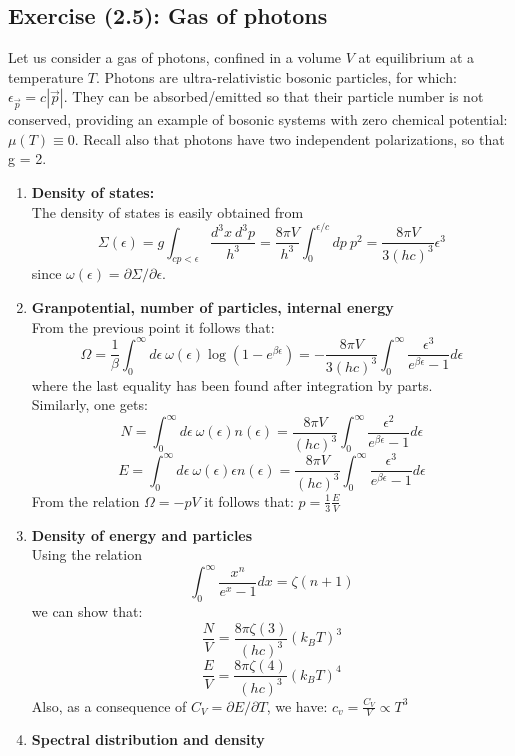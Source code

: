 \subsection{Exercise (2.5): Gas of photons}
Let us consider a gas of photons, confined in a volume $V$ at equilibrium at a temperature $T$.
Photons are ultra-relativistic bosonic particles, for which: $\epsilon_{\vec p} = c|\vec p|$. They can be absorbed/emitted so that their particle number is not conserved, providing an example of bosonic systems with zero chemical potential: $\mu(T) \equiv 0$. Recall also that photons have two independent polarizations, so that g = 2.
\begin{enumerate}
    \item \textbf{Density of states:}\\
    The density of states is easily obtained from $$\Sigma(\epsilon) = g\int_{cp < \epsilon} \frac{d^3 x\ d^3p}{h^3} = \frac{8\pi V}{h^3} \int_0^{\epsilon/c} dp \ p^2 = \frac{8\pi V}{3(hc)^3}\epsilon^3$$
    since $\omega (\epsilon) = \partial\Sigma / \partial \epsilon$.
    \item \textbf{Granpotential, number of particles, internal energy}\\
    From the previous point it follows that:
    $$\Omega = \frac 1\beta \int_0^\infty d\epsilon \ \omega(\epsilon) \log(1-e^{\beta \epsilon}) = -\frac{8\pi V}{3(hc)^3} \int_0^\infty \frac{\epsilon^3}{e^{\beta \epsilon} - 1} d\epsilon$$
    where the last equality has been found after integration by parts.\\Similarly, one gets:
    $$ N = \int_0^\infty d\epsilon \ \omega(\epsilon) n(\epsilon) = \frac{8\pi V}{(hc)^3} \int_0^\infty \frac{\epsilon^2}{e^{\beta \epsilon}-1} d\epsilon$$
    $$ E= \int_0^\infty d\epsilon \ \omega(\epsilon)\epsilon n(\epsilon) = \frac{8\pi V}{(hc)^3} \int_0^\infty\frac{\epsilon^3}{e^{\beta \epsilon}-1}d\epsilon$$
    From the relation $\Omega = -pV$ it follows that: $p = \frac 13 \frac EV$
    \item \textbf{Density of energy and particles}\\
    Using the relation 
    $$\int_0^\infty \frac{x^n}{e^x -1}dx = \zeta(n+1)$$
    we can show that:
    $$ \frac NV = \frac{8\pi \zeta(3)}{(hc)^3} (k_BT)^3$$
    $$ \frac EV = \frac{8\pi\zeta(4)}{(hc)^3}(k_BT)^4$$
    Also, as a consequence of $C_V = \partial E / \partial T$, we have: $c_v = \frac{C_V}V \propto T^3$
    \item \textbf{Spectral distribution and density}

\end{enumerate}

